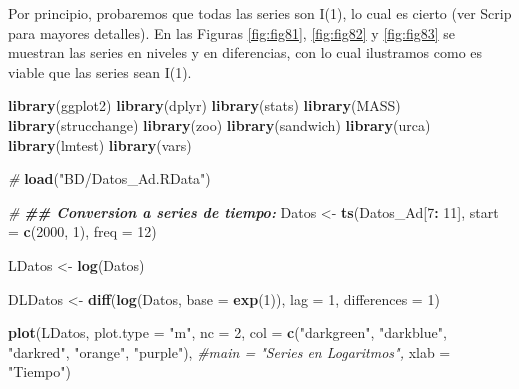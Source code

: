 \documentclass[
]{book}
\newenvironment{Shaded}{\begin{snugshade}}{\end{snugshade}}
\newcommand{\AttributeTok}[1]{\textcolor[rgb]{0.13,0.29,0.53}{#1}}
\newcommand{\CommentTok}[1]{\textcolor[rgb]{0.56,0.35,0.01}{\textit{#1}}}
\newcommand{\DecValTok}[1]{\textcolor[rgb]{0.00,0.00,0.81}{#1}}
\newcommand{\DocumentationTok}[1]{\textcolor[rgb]{0.56,0.35,0.01}{\textbf{\textit{#1}}}}
\newcommand{\FunctionTok}[1]{\textcolor[rgb]{0.13,0.29,0.53}{\textbf{#1}}}
\newcommand{\NormalTok}[1]{#1}
\newcommand{\OtherTok}[1]{\textcolor[rgb]{0.56,0.35,0.01}{#1}}
\newcommand{\SpecialCharTok}[1]{\textcolor[rgb]{0.81,0.36,0.00}{\textbf{#1}}}
\newcommand{\StringTok}[1]{\textcolor[rgb]{0.31,0.60,0.02}{#1}}
\begin{document}
Por principio, probaremos que todas las series son I(1), lo cual es cierto (ver Scrip para mayores detalles). En las Figuras \ref{fig:fig81}, \ref{fig:fig82} y \ref{fig:fig83} se muestran las series en niveles y en diferencias, con lo cual ilustramos como es viable que las series sean I(1).

\begin{Shaded}
\begin{Highlighting}[]
\FunctionTok{library}\NormalTok{(ggplot2)}
\FunctionTok{library}\NormalTok{(dplyr)}
\FunctionTok{library}\NormalTok{(stats)}
\FunctionTok{library}\NormalTok{(MASS)}
\FunctionTok{library}\NormalTok{(strucchange)}
\FunctionTok{library}\NormalTok{(zoo)}
\FunctionTok{library}\NormalTok{(sandwich)}
\FunctionTok{library}\NormalTok{(urca)}
\FunctionTok{library}\NormalTok{(lmtest)}
\FunctionTok{library}\NormalTok{(vars)}

\CommentTok{\#}
\FunctionTok{load}\NormalTok{(}\StringTok{"BD/Datos\_Ad.RData"}\NormalTok{)}

\CommentTok{\#}
\DocumentationTok{\#\# Conversion a series de tiempo:}
\NormalTok{Datos }\OtherTok{\textless{}{-}} \FunctionTok{ts}\NormalTok{(Datos\_Ad[}\DecValTok{7}\SpecialCharTok{:} \DecValTok{11}\NormalTok{], }
            \AttributeTok{start =} \FunctionTok{c}\NormalTok{(}\DecValTok{2000}\NormalTok{, }\DecValTok{1}\NormalTok{), }
            \AttributeTok{freq =} \DecValTok{12}\NormalTok{)}

\NormalTok{LDatos }\OtherTok{\textless{}{-}} \FunctionTok{log}\NormalTok{(Datos)}

\NormalTok{DLDatos }\OtherTok{\textless{}{-}} \FunctionTok{diff}\NormalTok{(}\FunctionTok{log}\NormalTok{(Datos, }\AttributeTok{base =} \FunctionTok{exp}\NormalTok{(}\DecValTok{1}\NormalTok{)), }
                \AttributeTok{lag =} \DecValTok{1}\NormalTok{, }
                \AttributeTok{differences =} \DecValTok{1}\NormalTok{)}
\end{Highlighting}
\end{Shaded}

\begin{Shaded}
\begin{Highlighting}[]
\FunctionTok{plot}\NormalTok{(LDatos, }
     \AttributeTok{plot.type =} \StringTok{"m"}\NormalTok{, }\AttributeTok{nc =} \DecValTok{2}\NormalTok{,}
     \AttributeTok{col =} \FunctionTok{c}\NormalTok{(}\StringTok{"darkgreen"}\NormalTok{, }\StringTok{"darkblue"}\NormalTok{, }\StringTok{"darkred"}\NormalTok{, }\StringTok{"orange"}\NormalTok{, }\StringTok{"purple"}\NormalTok{), }
     \CommentTok{\#main = "Series en Logaritmos", }
     \AttributeTok{xlab =} \StringTok{"Tiempo"}\NormalTok{)}
\end{Highlighting}
\end{Shaded}
\end{document}
